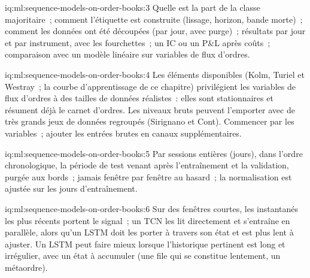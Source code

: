 \begin{solution}{iq:ml:sequence-models-on-order-books:3}
Quelle est la part de la classe majoritaire~; comment l'étiquette est construite (lissage, horizon, bande morte)~; comment les données ont été découpées (par jour,
avec purge)~; résultats par jour et par instrument, avec les fourchettes~; un IC ou un P\&L après coûts~; comparaison avec un modèle linéaire sur
variables de flux d'ordres.
\end{solution}

\begin{solution}{iq:ml:sequence-models-on-order-books:4}
Les éléments disponibles (Kolm, Turiel et Westray~; la courbe d'apprentissage de ce chapitre) privilégient les variables de flux d'ordres à des tailles de données réalistes~:
elles sont stationnaires et résument déjà le carnet d'ordres. Les niveaux bruts peuvent l'emporter avec de très grands jeux de données regroupés (Sirignano et
Cont). Commencer par les variables~; ajouter les entrées brutes en canaux supplémentaires.
\end{solution}

\begin{solution}{iq:ml:sequence-models-on-order-books:5}
Par sessions entières (jours), dans l'ordre chronologique, la période de test venant après l'entraînement et la validation, purgée aux bords~; jamais
fenêtre par fenêtre au hasard~; la normalisation est ajustée sur les jours d'entraînement.
\end{solution}

\begin{solution}{iq:ml:sequence-models-on-order-books:6}
Sur des fenêtres courtes, les instantanés les plus récents portent le signal~; un TCN les lit directement et s'entraîne en parallèle, alors qu'un
LSTM doit les porter à travers son état et est plus lent à ajuster. Un LSTM peut faire mieux lorsque l'historique pertinent est long et
irrégulier, avec un état à accumuler (une file qui se constitue lentement, un métaordre).
\end{solution}
